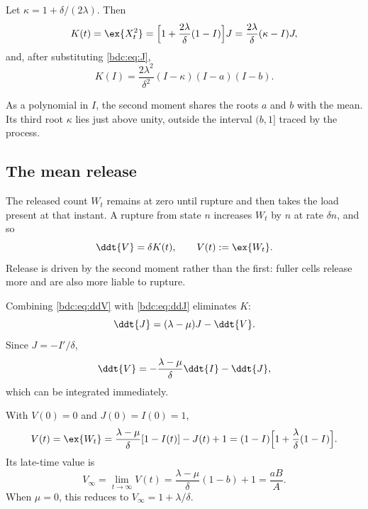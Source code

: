 \begin{theorem}
\label{bdc:thm:K}
Let $\kappa=1+\delta/(2\lambda)$. Then
\begin{equation}
\label{bdc:eq:K}
K(t)=\ex{X_t^2}
=\Bigl[1+\frac{2\lambda}{\delta}(1-I)\Bigr]J
=\frac{2\lambda}{\delta}(\kappa-I)J,
\end{equation}
and, after substituting \cref{bdc:eq:J},
\begin{equation}
\label{bdc:eq:KI}
K(I)
=\frac{2\lambda^2}{\delta^2}(I-\kappa)(I-a)(I-b).
\end{equation}
\end{theorem}

As a polynomial in $I$, the second moment shares the roots $a$ and $b$ with
the mean. Its third root $\kappa$ lies just above unity, outside the interval
$(b,1]$ traced by the process.

\subsection{The mean release}
\label{bdc:sec:V}

The released count $W_t$ remains at zero until rupture and then takes the load
present at that instant. A rupture from state $n$ increases $W_t$ by $n$ at rate
$\delta n$, and so
\begin{equation}
\label{bdc:eq:ddV}
\ddt{V}=\delta K(t),
\qquad V(t):=\ex{W_t}.
\end{equation}
Release is driven by the second moment rather than the first: fuller cells
release more and are also more liable to rupture.

Combining \cref{bdc:eq:ddV} with \cref{bdc:eq:ddJ} eliminates $K$:
\[
\ddt{J}=(\lambda-\mu)J-\ddt{V}.
\]
Since $J=-I'/\delta$,
\[
\ddt{V}
=-\frac{\lambda-\mu}{\delta}\ddt{I}-\ddt{J},
\]
which can be integrated immediately.

\begin{theorem}
\label{bdc:thm:V}
With $V(0)=0$ and $J(0)=I(0)=1$,
\begin{equation}
\label{bdc:eq:V}
V(t)=\ex{W_t}
=\frac{\lambda-\mu}{\delta}[1-I(t)]-J(t)+1
=(1-I)\Bigl[1+\frac{\lambda}{\delta}(1-I)\Bigr].
\end{equation}
Its late-time value is
\begin{equation}
\label{bdc:eq:Vinf}
V_\infty
=\lim_{t\to\infty}V(t)
=\frac{\lambda-\mu}{\delta}(1-b)+1
=\frac{aB}{A}.
\end{equation}
When $\mu=0$, this reduces to $V_\infty=1+\lambda/\delta$.
\end{theorem}

